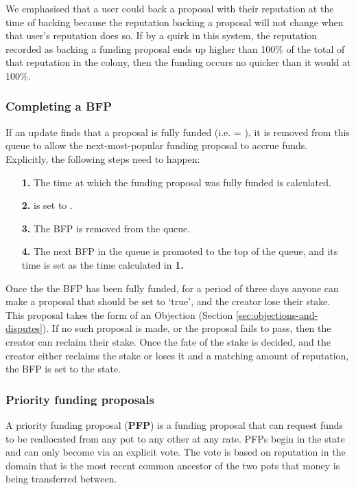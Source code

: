 We emphasised that a user could back a proposal with their reputation at the time of backing because the reputation backing a proposal will not change when that user's reputation does so. If by a quirk in this system, the reputation recorded as backing a funding proposal ends up higher than 100\% of the total of that reputation in the colony, then the funding occurs no quicker than it would at 100\%.

\subsubsection{Completing a BFP}
If an update finds that a proposal is fully funded (i.e.  = ), it is removed from this queue to allow the next-most-popular funding proposal to accrue funds. Explicitly, the following steps need to happen:
\begin{itemize}
 \item[\textbf{1.}] The time at which the funding proposal was fully funded is calculated.%
 \item[\textbf{2.}]  is set to .
 \item[\textbf{3.}] The BFP is removed from the queue.
 \item[\textbf{4.}] The next BFP in the queue is promoted to the top of the queue, and its  time is set as the time calculated in \textbf{1.}
\end{itemize}

Once the the BFP has been fully funded, for a period of three days anyone can make a proposal that  should be set to `true', and the creator lose their stake. This proposal takes the form of an Objection (Section \ref{sec:objections-and-disputes}). If no such proposal is made, or the proposal fails to pass, then the creator can reclaim their stake. Once the fate of the stake is decided, and the creator either reclaims the stake or loses it and a matching amount of reputation, the BFP is set to the  state.


\subsubsection{Priority funding proposals}
A priority funding proposal (\textbf{PFP}) is a funding proposal that can request funds to be reallocated from any pot to any other at any rate. PFPs begin in the  state and can only become  via an explicit vote. The vote is based on reputation in the domain that is the most recent common ancestor of the two pots that money is being transferred between.

